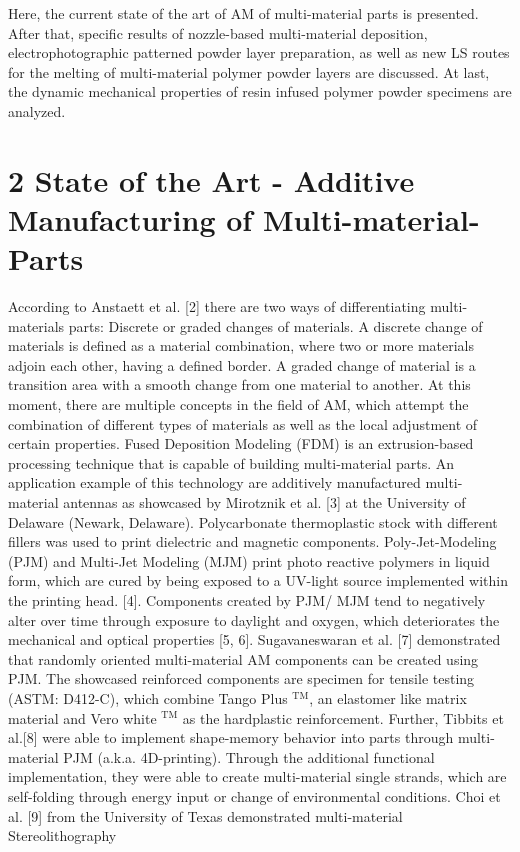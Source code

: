 \documentclass[10pt]{article}
\begin{document}
Here, the current state of the art of AM of multi-material parts is presented. After that, specific results of nozzle-based multi-material deposition, electrophotographic patterned powder layer preparation, as well as new LS routes for the melting of multi-material polymer powder layers are discussed. At last, the dynamic mechanical properties of resin infused polymer powder specimens are analyzed.

\section*{2 State of the Art - Additive Manufacturing of Multi-material-Parts}
According to Anstaett et al. [2] there are two ways of differentiating multi-materials parts: Discrete or graded changes of materials. A discrete change of materials is defined as a material combination, where two or more materials adjoin each other, having a defined border. A graded change of material is a transition area with a smooth change from one material to another. At this moment, there are multiple concepts in the field of AM, which attempt the combination of different types of materials as well as the local adjustment of certain properties. Fused Deposition Modeling (FDM) is an extrusion-based processing technique that is capable of building multi-material parts. An application example of this technology are additively manufactured multi-material antennas as showcased by Mirotznik et al. [3] at the University of Delaware (Newark, Delaware). Polycarbonate thermoplastic stock with different fillers was used to print dielectric and magnetic components. Poly-Jet-Modeling (PJM) and Multi-Jet Modeling (MJM) print photo reactive polymers in liquid form, which are cured by being exposed to a UV-light source implemented within the printing head. [4]. Components created by PJM/ MJM tend to negatively alter over time through exposure to daylight and oxygen, which deteriorates the mechanical and optical properties [5, 6]. Sugavaneswaran et al. [7] demonstrated that randomly oriented multi-material AM components can be created using PJM. The showcased reinforced components are specimen for tensile testing (ASTM: D412-C), which combine Tango Plus ${ }^{\mathrm{TM}}$, an elastomer like matrix material and Vero white ${ }^{\mathrm{TM}}$ as the hardplastic reinforcement. Further, Tibbits et al.[8] were able to implement shape-memory behavior into parts through multi-material PJM (a.k.a. 4D-printing). Through the additional functional implementation, they were able to create multi-material single strands, which are self-folding through energy input or change of environmental conditions. Choi et al. [9] from the University of Texas demonstrated multi-material Stereolithography
\end{document}
